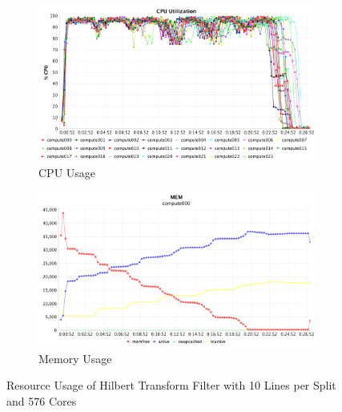 \begin{figure}[h]
\centering
\begin{subfigure}{1\textwidth}
  \centering
  \includegraphics[width=1\linewidth]{figures/Htf10_576_CPU.png}
  \caption{CPU Usage}
  \label{Htf10_576_CPU}
\end{subfigure}
\begin{subfigure}{1\textwidth}
  \centering
  \includegraphics[width=1\linewidth]{figures/Htf10_576_MEM.png}
  \caption{Memory Usage}
  \label{Htf10_576_MEM}
\end{subfigure}
\caption{Resource Usage of Hilbert Transform Filter with 10 Lines per Split and 576 Cores}
\label{Htf10_576}
\end{figure}


